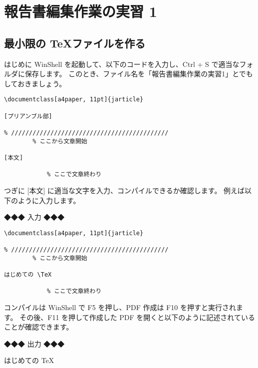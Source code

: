 \clearpage

\section{報告書編集作業の実習 1}
\subsection{最小限の \TeX ファイルを作る}
はじめに WinShell を起動して、以下のコードを入力し、Ctrl + S で適当なフォルダに保存します。
このとき、ファイル名を「報告書編集作業の実習1」とでもしておきましょう。



\begin{lstlisting}[basicstyle=\gt\ttfamily\footnotesize, frame=single]
\documentclass[a4paper, 11pt]{jarticle}

[プリアンブル部]

% ////////////////////////////////////////////
		% ここから文章開始

[本文]

			% ここで文章終わり
\end{lstlisting}



\noindent
つぎに [本文] に適当な文字を入力、コンパイルできるか確認します。
例えば以下のように入力します。


\vspace{\Cvs}
\noindent
◆◆◆ 入力 ◆◆◆
\begin{lstlisting}[basicstyle=\gt\ttfamily\footnotesize, frame=single]
\documentclass[a4paper, 11pt]{jarticle}

% ////////////////////////////////////////////
		% ここから文章開始

はじめての \TeX

			% ここで文章終わり
\end{lstlisting}


\noindent
コンパイルは WinShell で F5 を押し、PDF 作成は F10 を押すと実行されます。
その後、F11 を押して作成した PDF を開くと以下のように記述されていることが確認できます。


\vspace{\Cvs}
\noindent
◆◆◆ 出力 ◆◆◆
\begin{screen}
はじめての \TeX
\end{screen}

